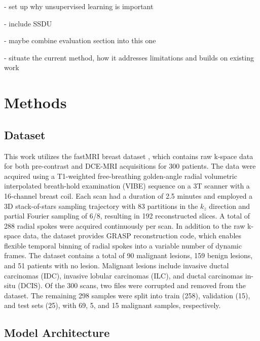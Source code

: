 \documentclass[runningheads]{llncs}
\begin{document}
- set up why unsupervised learning is important

- include SSDU

- maybe combine evaluation section into this one

- situate the current method, how it addresses limitations and builds on existing work


\section{Methods}

\subsection{Dataset}

This work utilizes the fastMRI breast dataset \cite{solomon2024fastmribreastpubliclyavailable}, which contains raw k-space data for both pre-contrast and DCE-MRI acquisitions for 300 patients. The data were acquired using a T1-weighted free-breathing golden-angle radial volumetric interpolated breath-hold examination (VIBE) sequence on a 3T scanner with a 16-channel breast coil. Each scan had a duration of 2.5 minutes and employed a 3D stack-of-stars sampling trajectory with 83 partitions in the $k_z$ direction and partial Fourier sampling of 6/8, resulting in 192 reconstructed slices. A total of 288 radial spokes were acquired continuously per scan. In addition to the raw k-space data, the dataset provides GRASP reconstruction code, which enables flexible temporal binning of radial spokes into a variable number of dynamic frames. The dataset contains a total of 90 malignant lesions, 159 benign lesions, and 51 patients with no lesion. Malignant lesions include invasive ductal carcinomas (IDC), invasive lobular carcinomas (ILC), and ductal carcinomas in-situ (DCIS). Of the 300 scans, two files were corrupted and removed from the dataset. The remaining 298 samples were split into train (258), validation (15), and test sets (25), with 69, 5, and 15 malignant samples, respectively.


\subsection{Model Architecture}
\end{document}
